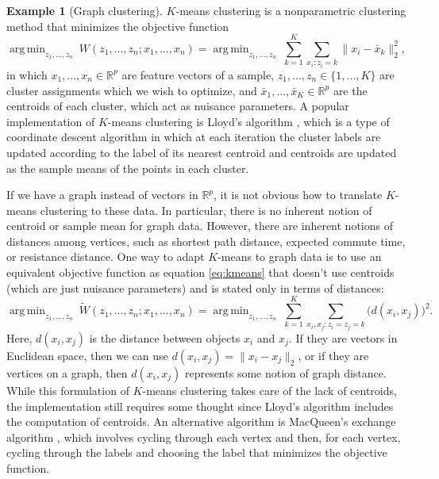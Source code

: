 \documentclass[
  12pt,
]{article}
\theoremstyle{definition}
\theoremstyle{definition}
\newtheorem{example}{Example}[section]
\theoremstyle{definition}
\theoremstyle{definition}
\theoremstyle{remark}
\begin{document}
\begin{example}[Graph clustering]
$K$-means clustering \citep{MacQueen1967} is a nonparametric clustering method that minimizes the objective function
\begin{equation}
\label{eq:kmeans}
\mathop{\mathrm{arg\,min}}_{z_1, ..., z_n} ~ W(z_1, ..., z_n; x_1, ..., x_n) = 
\mathop{\mathrm{arg\,min}}_{z_1, ..., z_n} ~ \sum_{k = 1}^K \sum_{x_i : z_i = k} \|x_i - \bar{x}_k\|_2^2,
\end{equation}
in which $x_1, ..., x_n \in \mathbb{R}^p$ are feature vectors of a sample, $z_1, ..., z_n \in \{1, ..., K\}$ are cluster assignments which we wish to optimize, and $\bar{x}_1, ..., \bar{x}_K \in \mathbb{R}^p$ are the centroids of each cluster, which act as nuisance parameters. 
A popular implementation of $K$-means clustering is Lloyd's algorithm \citep{1056489}, which is a type of coordinate descent algorithm in which at each iteration the cluster labels are updated according to the label of its nearest centroid and centroids are updated as the sample means of the points in each cluster. 

If we have a graph instead of vectors in $\mathbb{R}^p$, it is not obvious how to translate $K$-means clustering to these data. 
In particular, there is no inherent notion of centroid or sample mean for graph data. 
However, there are inherent notions of distances among vertices, such as shortest path distance, expected commute time, or resistance distance. 
One way to adapt $K$-means to graph data is to use an equivalent objective function as equation \eqref{eq:kmeans} that doesn't use centroids (which are just nuisance parameters) and is stated only in terms of distances:  
$$
\mathop{\mathrm{arg\,min}}_{z_1, ..., z_n} ~ \tilde{W}(z_1, ..., z_n; x_1, ..., x_n) =
\mathop{\mathrm{arg\,min}}_{z_1, ..., z_n} ~ \sum_{k=1}^K \sum_{x_i, x_j : z_i = z_j = k} \big( d(x_i, x_j) \big)^2.
$$
Here, $d(x_i, x_j)$ is the distance between objects $x_i$ and $x_j$. 
If they are vectors in Euclidean space, then we can use $d(x_i, x_j) = \|x_i - x_j\|_2$, 
or if they are vertices on a graph, then $d(x_i, x_j)$ represents some notion of graph distance. 
While this formulation of $K$-means clustering takes care of the lack of centroids, the implementation still requires some thought since Lloyd's algorithm includes the computation of centroids. 
An alternative algorithm is MacQueen's exchange algorithm \citep{MacQueen1967}, which involves cycling through each vertex and then, for each vertex, cycling through the labels and choosing the label that minimizes the objective function. 


\end{example}
\end{document}
